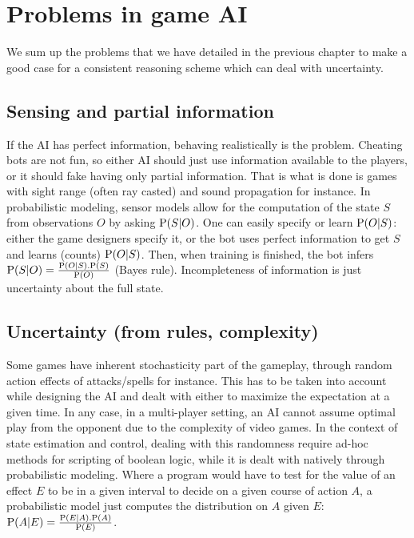 

\section{Problems in game AI}
We sum up the problems that we have detailed in the previous chapter to make a good case for a consistent reasoning scheme which can deal with uncertainty.

\subsection{Sensing and partial information} %
If the AI has perfect information, behaving realistically is the problem. Cheating bots are not fun, so either AI should just use information available to the players, or it should fake having only partial information. That is what is done is  games with sight range (often ray casted) and sound propagation for instance. In probabilistic modeling, sensor models allow for the computation of the state $S$ from observations $O$ by asking $\mathrm{P}(S|O)$. One can easily specify or learn $\mathrm{P}(O|S)$: either the game designers specify it, or the bot uses perfect information to get $S$ and learns (counts) $\mathrm{P}(O|S)$. Then, when training is finished, the bot infers $\mathrm{P}(S|O) = \frac{\mathrm{P}(O|S).\mathrm{P}(S)}{\mathrm{P}(O)}$ (Bayes rule). Incompleteness of information is just uncertainty about the full state.

\subsection{Uncertainty (from rules, complexity)} %
Some games have inherent stochasticity part of the gameplay, through random action effects of attacks/spells for instance. This has to be taken into account while designing the AI and dealt with either to maximize the expectation at a given time. In any case, in a multi-player setting, an AI cannot assume optimal play from the opponent due to the complexity of video games. In the context of state estimation and control, dealing with this randomness require ad-hoc methods for scripting of boolean logic, while it is dealt with natively through probabilistic modeling. Where a program would have to test for the value of an effect $E$ to be in a given interval to decide on a given course of action $A$, a probabilistic model just computes the distribution on $A$ given $E$: $\mathrm{P}(A|E) = \frac{\mathrm{P}(E|A).\mathrm{P}(A)}{\mathrm{P}(E)}$.

